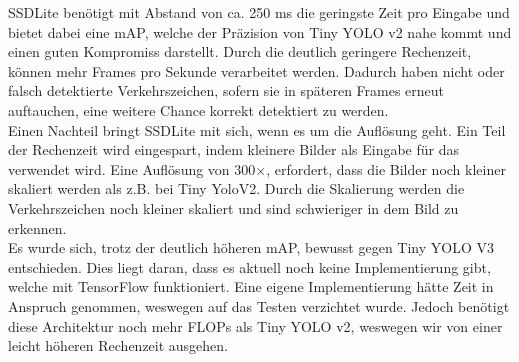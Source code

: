 \documentclass[12pt,a4paper,ngerman,enabledeprecatedfontcommands]{scrreprt}
\begin{document}
SSDLite\cite{DBLP:journals/corr/abs-1801-04381} benötigt mit Abstand von ca. 250 ms die geringste Zeit pro Eingabe und bietet dabei eine \gls{mAP}, welche der Präzision von Tiny YOLO v2\cite{DBLP:journals/corr/RedmonF16} nahe kommt und einen guten Kompromiss darstellt. Durch die deutlich geringere Rechenzeit, können mehr Frames pro Sekunde verarbeitet werden. Dadurch haben nicht oder falsch detektierte Verkehrszeichen, sofern sie in späteren Frames erneut auftauchen, eine weitere Chance korrekt detektiert zu werden.\\
Einen Nachteil bringt SSDLite\cite{DBLP:journals/corr/abs-1801-04381} mit sich, wenn es um die Auflösung geht. Ein Teil der Rechenzeit wird eingespart, indem kleinere Bilder als Eingabe für das  verwendet wird.
Eine Auflösung von 300$\times$, erfordert, dass die Bilder noch kleiner skaliert werden als z.B. bei Tiny YoloV2\cite{DBLP:journals/corr/RedmonF16}.
Durch die Skalierung werden die Verkehrszeichen noch kleiner skaliert und sind schwieriger in dem Bild zu erkennen.\\
Es wurde sich, trotz der deutlich höheren \gls{mAP}, bewusst gegen Tiny YOLO V3\cite{DBLP:journals/corr/abs-1804-02767} entschieden.
Dies liegt daran, dass es aktuell noch keine Implementierung gibt, welche mit TensorFlow funktioniert.
Eine eigene Implementierung hätte Zeit in Anspruch genommen, weswegen auf das Testen verzichtet wurde.
Jedoch benötigt diese Architektur noch mehr FLOPs als Tiny YOLO v2\cite{DBLP:journals/corr/RedmonF16}, weswegen wir von einer leicht höheren Rechenzeit ausgehen.
\end{document}
